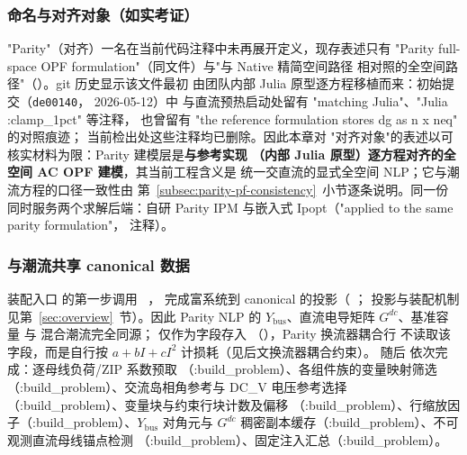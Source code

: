 \subsubsection*{命名与对齐对象（如实考证）}
"Parity"（对齐）一名在当前代码注释中未再展开定义，现存表述只有
"Parity full-space OPF formulation"（同文件）与"与 Native 精简空间路径
相对照的全空间路径"（）。git 历史显示该文件最初
由团队内部 Julia 原型逐方程移植而来：初始提交（\texttt{de00140}，
2026-05-12）中  与直流预热启动处留有
"matching Julia"、"Julia :clamp\_1pct" 等注释，
也曾留有 "the reference formulation stores dg as n x neq" 的对照痕迹；
当前检出处这些注释均已删除。因此本章对
"对齐对象"的表述以可核实材料为限：Parity 建模层是\textbf{与参考实现
（内部 Julia 原型）逐方程对齐的全空间 AC OPF 建模}，其当前工程含义是
统一交直流的显式全空间 NLP；它与潮流方程的口径一致性由
第~\ref{subsec:parity-pf-consistency}~小节逐条说明。同一份
 同时服务两个求解后端：自研 Parity IPM 与嵌入式
Ipopt（"applied to the same parity formulation"，
注释）。

\subsubsection*{与潮流共享 canonical 数据}
\begin{sloppypar}
装配入口  的第一步调用
\allowbreak\ ，
完成富系统到 canonical  的投影（
；
投影与装配机制见第~\ref{sec:overview}~节）。因此 Parity NLP 的
$Y_{\mathrm{bus}}$、直流电导矩阵 $G^{dc}$、基准容量  与
混合潮流完全同源； 仅作为字段存入 
（），Parity 换流器耦合行
不读取该字段，而是自行按 $a+bI+cI^2$ 计损耗（见后文换流器耦合约束）。
随后  依次完成：逐母线负荷/ZIP 系数预取
（:build\_problem）、各组件族的变量映射筛选（:build\_problem）、交流岛相角参考与
DC\_V 电压参考选择（:build\_problem）、变量块与约束行块计数及偏移
（:build\_problem）、行缩放因子（:build\_problem）、$Y_{\mathrm{bus}}$ 对角元与
$G^{dc}$ 稠密副本缓存（:build\_problem）、不可观测直流母线锚点检测
（:build\_problem）、固定注入汇总（:build\_problem）。
\end{sloppypar}

